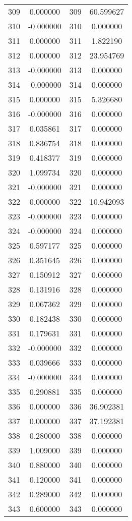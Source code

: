 \documentclass[12pt]{article}
\begin{document}
\begin{longtable}{@{}cccc@{}}
309 & 0.000000 & 309 & 60.599627 \\
310 & -0.000000 & 310 & 0.000000 \\
311 & 0.000000 & 311 & 1.822190 \\
312 & 0.000000 & 312 & 23.954769 \\
313 & -0.000000 & 313 & 0.000000 \\
314 & -0.000000 & 314 & 0.000000 \\
315 & 0.000000 & 315 & 5.326680 \\
316 & -0.000000 & 316 & 0.000000 \\
317 & 0.035861 & 317 & 0.000000 \\
318 & 0.836754 & 318 & 0.000000 \\
319 & 0.418377 & 319 & 0.000000 \\
320 & 1.099734 & 320 & 0.000000 \\
321 & -0.000000 & 321 & 0.000000 \\
322 & 0.000000 & 322 & 10.942093 \\
323 & -0.000000 & 323 & 0.000000 \\
324 & -0.000000 & 324 & 0.000000 \\
325 & 0.597177 & 325 & 0.000000 \\
326 & 0.351645 & 326 & 0.000000 \\
327 & 0.150912 & 327 & 0.000000 \\
328 & 0.131916 & 328 & 0.000000 \\
329 & 0.067362 & 329 & 0.000000 \\
330 & 0.182438 & 330 & 0.000000 \\
331 & 0.179631 & 331 & 0.000000 \\
332 & -0.000000 & 332 & 0.000000 \\
333 & 0.039666 & 333 & 0.000000 \\
334 & -0.000000 & 334 & 0.000000 \\
335 & 0.290881 & 335 & 0.000000 \\
336 & 0.000000 & 336 & 36.902381 \\
337 & 0.000000 & 337 & 37.192381 \\
338 & 0.280000 & 338 & 0.000000 \\
339 & 1.009000 & 339 & 0.000000 \\
340 & 0.880000 & 340 & 0.000000 \\
341 & 0.120000 & 341 & 0.000000 \\
342 & 0.289000 & 342 & 0.000000 \\
343 & 0.600000 & 343 & 0.000000 \\

\end{longtable}
\end{document}

